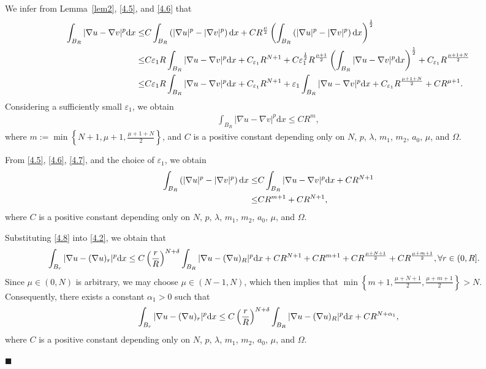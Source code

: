 \documentclass[onecolumn]{autart}
\newenvironment{proof}{{\it Proof: \enspace}}{\hfill $\blacksquare$\par}
\begin{document}
\begin{proof}
		We infer from Lemma~\ref{lem2}, \eqref{4.5}, and \eqref{4.6} that
		\begin{align}
			\int_{B_R} |\nabla u - \nabla v|^p \mathrm{d}x
			\leq
			& C \int_{B_R} \left(|\nabla u|^p - |\nabla v|^p\right) \mathrm{d}x + C R^{\frac{\mu}{2}} \left( \int_{B_R} \left(|\nabla u|^p - |\nabla v|^p\right) \mathrm{d}x \right)^{\frac{1}{2}}
			\notag\\ \leq
			&  C \varepsilon_1 R \int_{B_R} |\nabla u - \nabla v|^p \mathrm{d}x + C_{\varepsilon_1} R^{N+1}  + C \varepsilon_1^{\frac{1}{2}} R^{\frac{\mu+1}{2}} \left( \int_{B_R} |\nabla u - \nabla v|^p \mathrm{d}x \right)^{\frac{1}{2}} + C_{\varepsilon_1} R^{\frac{\mu+1+N}{2}}
			\notag\\ \leq
			&  C \varepsilon_1 R \int_{B_R} |\nabla u - \nabla v|^p\mathrm{d}x + C_{\varepsilon_1} R^{N+1} + \varepsilon_1 \int_{B_R} |\nabla u - \nabla v|^p \mathrm{d}x + C_{\varepsilon_1} R^{\frac{\mu+1+N}{2}} +  C R^{\mu+1}. \notag
		\end{align}
		Considering a sufficiently small $\varepsilon_1$, we obtain
		\begin{align}\label{4.7}
			\int_{B_R} |\nabla u - \nabla v|^p \mathrm{d}x \leq C  R^m,
		\end{align}
		where $m := \min \left\{ N + 1, \mu + 1, \frac{\mu + 1 + N}{2} \right\}$, and $C$ is a positive  constant  depending only on  $N$,  $p$, $\lambda$, $m_1$, $m_2$, $a_0$, $\mu$,  and  $\Omega$.
		
		
		From \eqref{4.5}, \eqref{4.6},  \eqref{4.7},  and the choice of $\varepsilon_1$, we obtain
		\begin{align}
			\int_{B_R} \left(|\nabla u|^p - |\nabla v|^p\right) \mathrm{d}x
			\leq
			& C \int_{B_R} |\nabla u - \nabla v|^p \mathrm{d}x + CR^{N+1}
			\notag\\ \leq
			& C R^{m+1} + C R^{N+1},\label{4.8}
		\end{align}
		where $C$ is a positive  constant  depending only on  $N$,  $p$, $\lambda$, $m_1$, $m_2$, $a_0$, $\mu$, and $\Omega$.
		
		
		Substituting \eqref{4.8} into \eqref{4.2}, we obtain that
		\begin{align}
			\int_{B_r} |\nabla u - (\nabla u)_r|^p \mathrm{d}x &\leq C \left( \frac{r}{R} \right)^{N+\delta} \int_{B_R} |\nabla u - (\nabla u)_R|^p \mathrm{d}x + C R^{N+1} + C R^{m+1}
			+ C R^{\frac{\mu+N+1}{2}} + C R^{\frac{\mu+m+1}{2}}, \forall r \in (0, R].\notag
		\end{align}
		Since $\mu \in (0, N)$ is arbitrary, we may choose $\mu \in (N-1, N)$, which then implies that $ \min \left\{ m + 1, \frac{\mu + N + 1}{2}, \frac{\mu + m + 1}{2} \right\} > N$. Consequently, there exists a constant $\alpha_1 > 0$ such that
		\begin{align}
			\int_{B_r} |\nabla u - (\nabla u)_r|^p \mathrm{d}x \leq C \left( \frac{r}{R} \right)^{N+\delta} \int_{B_R} |\nabla u - (\nabla u)_R|^p \mathrm{d}x + C R^{N+\alpha_1},\notag
		\end{align}
		where $C$ is a positive  constant  depending only on  $N$,  $p$, $\lambda$, $m_1$, $m_2$, $a_0$, $\mu$, and $\Omega$.
		

\end{proof}
\end{document}
